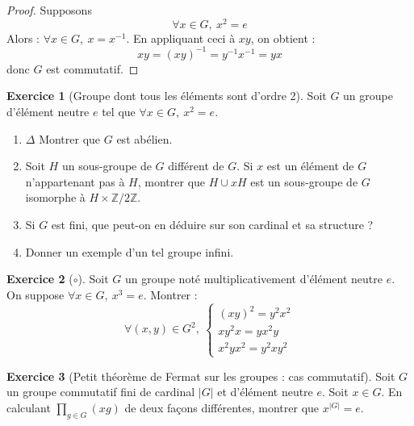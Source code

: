 \documentclass[french]{book}
\newcommand{\Z}{\mathbb{Z}}
\newcommand{\inv}{^{-1}}
\theoremstyle{definition}
\newtheorem{ex}{Exercice}[chapter]
\theoremstyle{theorem}
\theoremstyle{remark}
\begin{document}
\begin{proof}
	Supposons $$\forall x\in G,\ x^2=e$$ Alors : $\forall x\in G,\ x=x\inv$. En appliquant ceci à $xy$, on obtient : $$xy=(xy)\inv=y\inv x\inv=yx$$ donc $G$ est commutatif.
\end{proof}

\begin{ex}[Groupe dont tous les éléments sont d'ordre 2]
	Soit $G$ un groupe d'élément neutre $e$ tel que $\forall x\in G,\ x^2=e$.
	\begin{enumerate}
		\item $\Delta$ Montrer que $G$ est abélien.
		\item Soit $H$ un sous-groupe de $G$ différent de $G$. Si $x$ est un élément de $G$ n'appartenant pas à $H$, montrer que $H\cup xH$ est un sous-groupe de $G$ isomorphe à $H\times \Z/2\Z$.
		\item Si $G$ est fini, que peut-on en déduire sur son cardinal et sa structure ?
		\item Donner un exemple d'un tel groupe infini.
	\end{enumerate}
\end{ex}

\begin{ex}[$\circ$]
	Soit $G$ un groupe noté multiplicativement d'élément neutre $e$. On suppose $\forall x\in G,\ x^3=e$. Montrer : $$\forall (x,y)\in G^2,\ \begin{cases}
		(xy)^2=y^2x^2 \\
		xy^2x=yx^2y \\
		x^2yx^2=y^2xy^2
	\end{cases}$$
\end{ex}

\begin{ex}[Petit théorème de Fermat sur les groupes : cas commutatif]
	Soit $G$ un groupe commutatif fini de cardinal $|G|$ et d'élément neutre $e$. Soit $x\in G$. En calculant $\displaystyle \prod_{g \in G}(xg)$ de deux façons différentes, montrer que $x^{|G|}=e$.
\end{ex}
\end{document}
